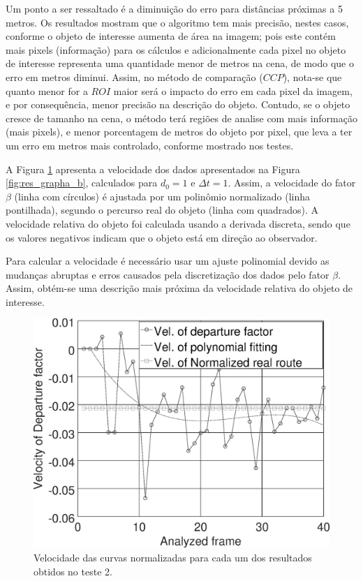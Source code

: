Um ponto a ser ressaltado é a diminuição do erro para distâncias próximas a 5 metros.  
Os resultados mostram que o algoritmo tem mais precisão, nestes casos, conforme o objeto de interesse 
aumenta de área na imagem; pois este contém mais pixels (informação)
para os cálculos e adicionalmente cada pixel no objeto de interesse 
representa uma quantidade menor de metros na cena, de modo que
o erro em metros diminui.
Assim, no método de comparação ($CCP$), nota-se que quanto menor for a $ROI$ 
maior será o impacto do erro em cada pixel da imagem, 
e por consequência, menor precisão na descrição do objeto. 
Contudo, se o objeto cresce de tamanho na cena,
o método terá regiões de analise com mais informação (mais pixels), e menor porcentagem de metros do objeto por pixel,
que leva a ter um erro em metros mais controlado, conforme mostrado nos testes. 

A Figura \ref{fig:res_grapha_bv} apresenta a velocidade dos dados apresentados 
na Figura \ref{fig:res_grapha_b}, calculados para $d_0=1$ e $\Delta t=1$.
Assim, a velocidade do fator $\beta$ (linha com círculos) é ajustada por um polinômio
normalizado (linha pontilhada), segundo o percurso real do objeto (linha com quadrados).
A velocidade relativa do objeto foi calculada usando a derivada
discreta, sendo que os valores negativos indicam que o objeto está
em direção ao observador.

Para calcular a velocidade é necessário usar um ajuste polinomial devido 
as mudanças abruptas e erros causados pela discretização dos dados pelo fator $\beta$.
Assim, obtém-se uma descrição mais próxima da velocidade relativa do 
objeto de interesse.

\begin{figure}[H]
\includegraphics[width=\columnwidth]{images/graphvelocity.eps}
\caption{Velocidade das curvas normalizadas para cada um dos resultados obtidos no teste 2.}
\label{fig:res_grapha_bv}
\end{figure}
